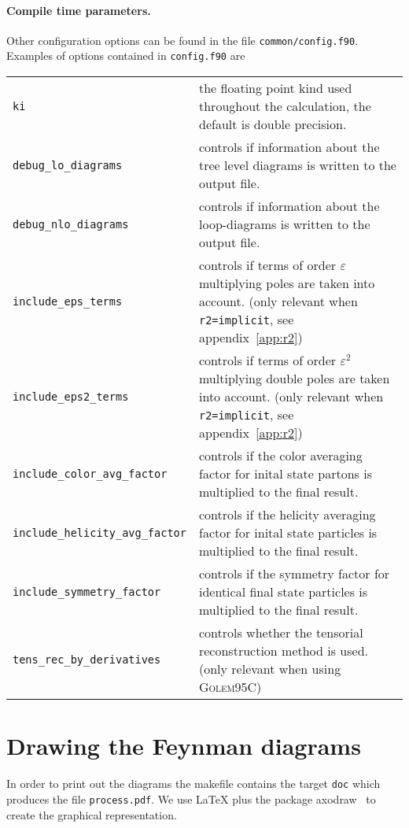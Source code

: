 \documentclass[11pt,a4paper]{refrep}
\newcommand{\golemVC}{\textsc{Golem95C}\xspace}
\begin{document}
\paragraph{Compile time parameters.}
Other configuration options can be found in the file \texttt{common/config.f90}.
\smallskip
Examples of options contained in \texttt{config.f90} are
\begin{maxipage}
\begin{tabular}{lp{}}
\texttt{ki} & the floating point kind used throughout the calculation, the default is double precision.\\
\texttt{debug\_lo\_diagrams} & controls if information about the
    tree level diagrams is written to the output file.\\
\texttt{debug\_nlo\_diagrams} & controls if information about the
    loop-diagrams is written to the output file.\\
\texttt{include\_eps\_terms} & controls if
    terms of order $\varepsilon$ multiplying
    poles are taken into account. (only relevant when \texttt{r2=implicit}, see appendix~\ref{app:r2})\\
\texttt{include\_eps2\_terms} & controls if
    terms of order $\varepsilon^2$ multiplying
    double poles are taken into account. (only relevant when \texttt{r2=implicit}, see appendix~\ref{app:r2})\\
\texttt{include\_color\_avg\_factor} & controls if the color averaging
    factor for inital state partons is multiplied to the final result.\\
\texttt{include\_helicity\_avg\_factor} & controls if the helicity averaging
    factor for inital state particles is multiplied to the final result.\\
\texttt{include\_symmetry\_factor} & controls if the symmetry
    factor for identical final state particles
    is multiplied to the final result. \\
\texttt{tens\_rec\_by\_derivatives} & controls whether the tensorial reconstruction method is used. (only relevant when using \golemVC{})
\end{tabular}
\end{maxipage}

\section{Drawing the Feynman diagrams}
In order to print out the diagrams the makefile contains the target
\texttt{doc} which produces the file \texttt{process.pdf}.
We use \LaTeX{} plus the package \textsf{axodraw}~\cite{Vermaseren:1994je}
to create the graphical representation.
\end{document}
